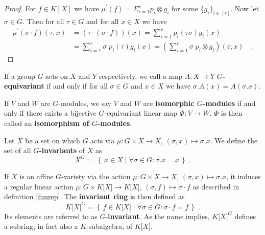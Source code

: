 \begin{proof}
  For $f \in K[X]$ we have $ \bar{\mu}^\prime (f) = \Sigma_{i=1}^r p_i \otimes g_i$ for some $\{g_i\}_{i \in [r]}$.
  Now let $\sigma \in G$.
  Then for all $\tau \in G$ and for all $x \in X$ we have
  \begin{equation*}
    \begin{aligned}
      \bar{\mu}^\prime (\sigma\cdot f) (\tau,x)
      &=(\tau\cdot (\sigma\cdot f)) (x)
      =\sum_{i=1}^r p_i(\tau\sigma) g_i(x) \\
      &=\sum_{i=1}^r \sigma\dot{\phantom{.}}p_i(\tau) g_i(x)
      =(\sum_{i=1}^r \sigma \dot{\phantom{.}}p_i \otimes g_i) (\tau,x) \quad .
    \end{aligned}
  \end{equation*}
\end{proof}

\begin{definition}
  If a group $G$ acts on $X$ and $Y$ respectively, we call a map $A \colon X \rightarrow Y$ \textbf{$G$-equivariant} if and only if for all $\sigma \in G$ and $x \in X$ we have $\sigma . A(x) = A (\sigma . x)$.

  If $V$ and $W$ are $G$-modules, we say $V$ and $W$ are \textbf{isomorphic $G$-modules} if and only if there exists a bijective $G$-equivariant linear map $\Phi \colon V \rightarrow W$.
  $\Phi$ is then called an \textbf{isomorphism of $G$-modules}.
\end{definition}

\begin{definition}[Invariants]
  Let $X$ be a set on which $G$ acts via \linebreak$\mu \colon G \times X \rightarrow X$, $(\sigma,x) \mapsto \sigma.x$.
  We define the set of all \textbf{$G$-invariants} of $X$ as
  \begin{equation*}
    X^G := \left\{\, x \in X \mid \forall \sigma \in G : \sigma . x = x \,\right\} \; .
  \end{equation*}

  If $X$ is an affine $G$-variety via the action $\mu \colon G \times X \rightarrow X$, $(\sigma,x) \mapsto \sigma.x$, it induces a regular linear action $ \bar{\mu} \colon G \times K\lbrack X\rbrack \rightarrow K\lbrack X\rbrack $, $(\sigma,f)\mapsto\sigma\cdot f$ as described in definition \ref{funrep}.
  The \textbf{invariant ring} is then defined as
  \begin{equation*}
    K\lbrack X\rbrack^G = \left\{ \, f \in K\lbrack X \rbrack \mid \forall \sigma \in G : \sigma \cdot f = f \, \right\} \; .
  \end{equation*}
  Its elements are referred to as $G$-\textbf{invariant}.
  As the name implies, $ K\lbrack X\rbrack^G $ defines a subring, in fact also a $K$-subalgebra, of $ K\lbrack X\rbrack $.
\end{definition}

